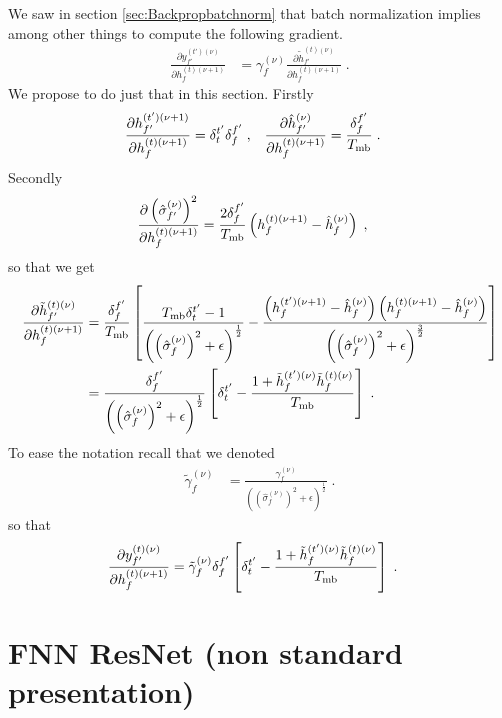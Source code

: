 \begin{subappendices}
We saw in section \ref{sec:Backpropbatchnorm} that batch normalization implies among other things to compute the following gradient.
\begin{align}
\frac{\partial y^{(t')(\nu)}_{f'}}{\partial h_{f}^{(t)(\nu+1)}}&=
%
\gamma^{(\nu)}_f\frac{\partial \tilde{h}_{f'}^{(t)(\nu)}}{\partial h_{f}^{(t)(\nu+1)}}\;.
\end{align}
We propose to do just that in this section. Firstly
\begin{align}
\frac{\partial h^{(t')(\nu+1)}_{f'}}{\partial h_{f}^{(t)(\nu+1)}}&=\delta^{t'}_t\delta^{f'}_f\;,&
%
\frac{\partial \hat{h}_{f'}^{(\nu)}}{\partial h_{f}^{(t)(\nu+1)}}&=\frac{\delta^{f'}_f}{T_{{\rm mb}}}\;.
\end{align}
Secondly
\begin{align}
\frac{\partial \left(\hat{\sigma}_{f'}^{(\nu)}\right)^2}{\partial h_{f}^{(t)(\nu+1)}}&=
%
\frac{2\delta^{f'}_f}{T_{{\rm mb}}}\left(h_{f}^{(t)(\nu+1)}-\hat{h}_{f}^{(\nu)}\right)\;,
\end{align}
so that we get
\begin{align}
\frac{\partial \tilde{h}_{f'}^{(t)(\nu)}}{\partial h_{f}^{(t)(\nu+1)}}&=
%
\frac{\delta^{f'}_f}{T_{{\rm mb}}}\left[\frac{T_{{\rm mb}}\delta^{t'}_t-1}
%
{\left(\left(\hat{\sigma}_{f}^{(\nu)}\right)^2+\epsilon\right)^\frac12}-
%
\frac{\left(h_{f}^{(t')(\nu+1)}-\hat{h}_{f}^{(\nu)}\right)\left(h_{f}^{(t)(\nu+1)}-\hat{h}_{f}^{(\nu)}\right)}
%
{\left(\left(\hat{\sigma}_{f}^{(\nu)}\right)^2+\epsilon\right)^\frac32}\right]\notag\\
%
&=\frac{\delta^{f'}_f}{\left(\left(\hat{\sigma}_{f}^{(\nu)}\right)^2+\epsilon\right)^\frac12}
%
\left[\delta^{t'}_t-
%
\frac{1+\tilde{h}_{f}^{(t')(\nu)}\tilde{h}_{f}^{(t)(\nu)}}{T_{{\rm mb}}}\right]\;.
\end{align}
To ease the notation recall that we denoted
\begin{align}
\tilde{\gamma}^{(\nu)}_f&=
%
\frac{\gamma^{(\nu)}_f}{\left(\left(\hat{\sigma}_{f}^{(\nu)}\right)^2+\epsilon\right)^\frac12}\;.
\end{align}
%
%
so that
\begin{align}
\frac{\partial y_{f'}^{(t)(\nu)}}{\partial h_{f}^{(t)(\nu+1)}}&=
%
\tilde{\gamma}^{(\nu)}_f \delta^{f'}_f\left[\delta^{t'}_t-
%
\frac{1+\tilde{h}_{f}^{(t')(\nu)}\tilde{h}_{f}^{(t)(\nu)}}{T_{{\rm mb}}}\right]\;.
\end{align}



\section{FNN ResNet (non standard presentation)} \label{sec:ResnetFNN}


\end{subappendices}
